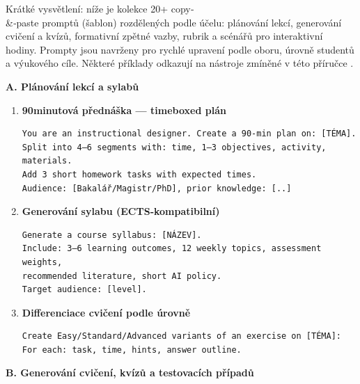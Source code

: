 \medskip

Krátké vysvětlení: níže je kolekce 20+ copy‑\\ \&‑paste promptů (šablon) rozdělených podle účelu: plánování lekcí, generování cvičení a kvízů, formativní zpětné vazby, rubrik a scénářů pro interaktivní hodiny. Prompty jsou navrženy pro rychlé upravení podle oboru, úrovně studentů a výukového cíle. Některé příklady odkazují na nástroje zmíněné v této příručce \cite{kb_ai_101_tipu_pdf_04e4a115_page_15_2,kb_ai_101_tipu_pdf_04e4a115_page_8_1,kb_ai_101_tipu_pdf_04e4a115_page_7_1}.

\medskip

\textbf{A. Plánování lekcí a sylabů}

\begin{enumerate}
  \item \textbf{90minutová přednáška — timeboxed plán}
  \begin{verbatim}
You are an instructional designer. Create a 90-min plan on: [TÉMA].
Split into 4–6 segments with: time, 1–3 objectives, activity, materials.
Add 3 short homework tasks with expected times.
Audience: [Bakalář/Magistr/PhD], prior knowledge: [..]
  \end{verbatim}
  \item \textbf{Generování sylabu (ECTS‑kompatibilní)}
  \begin{verbatim}
Generate a course syllabus: [NÁZEV].
Include: 3–6 learning outcomes, 12 weekly topics, assessment weights,
recommended literature, short AI policy.
Target audience: [level].
  \end{verbatim}
  \item \textbf{Differenciace cvičení podle úrovně}
  \begin{verbatim}
Create Easy/Standard/Advanced variants of an exercise on [TÉMA]:
For each: task, time, hints, answer outline.
  \end{verbatim}
\end{enumerate}

\medskip

\textbf{B. Generování cvičení, kvízů a testovacích případů}

